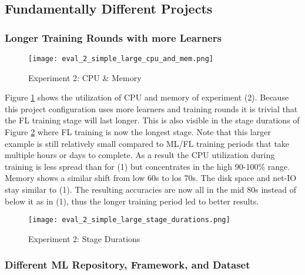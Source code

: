 \subsection{Fundamentally Different Projects}

\subsubsection{Longer Training Rounds with more Learners}

\begin{figure}[H]
    \begin{adjustwidth}{-0.2\paperwidth}{-0.2\paperwidth}
        \centering
        \texttt{[image: eval\_2\_simple\_large\_cpu\_and\_mem.png]}
        \caption{Experiment 2: CPU \& Memory}
        \label{fig:eval_2_cpu_mem}
    \end{adjustwidth}
\end{figure}

Figure \ref{fig:eval_2_cpu_mem} shows the utilization of CPU and memory of experiment (2).
Because this project configuration uses more learners and training rounds it is trivial that the FL training stage will last longer.
This is also visible in the stage durations of Figure \ref{fig:eval_2_simplest_stage_durations} where FL training is now the longest stage.
Note that this larger example is still relatively small compared to ML/FL training periods that take multiple hours or days to complete.
As a result the CPU utilization during training is less spread than for (1) but concentrates in the high 90-100\% range.
Memory shows a similar shift from low 60s to los 70s.
The disk space and net-IO stay similar to (1).
The resulting accuracies are now all in the mid 80s instead of below it as in (1), thus the longer training period led to better results.

\begin{figure}[H]
    \begin{adjustwidth}{-0.2\paperwidth}{-0.2\paperwidth}
        \centering
        \texttt{[image: eval\_2\_simple\_large\_stage\_durations.png]}
        \caption{Experiment 2: Stage Durations}
        \label{fig:eval_2_simplest_stage_durations}
    \end{adjustwidth}
\end{figure}

\subsubsection{Different ML Repository, Framework, and Dataset}

